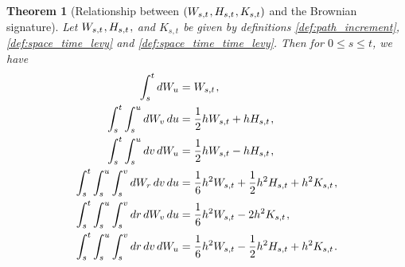 \documentclass[sn-mathphys-num]{sn-jnl}%
\newtheorem{theorem}{Theorem}%
\newcommand{\m}{\hspace{0.25mm}}
\begin{document}
\begin{theorem}[Relationship between $(W_{s,t}\m, H_{s,t}\m, K_{s,t})$ and the Brownian signature]\label{thm:whk_relation}
Let $W_{s,t}\m, H_{s,t}\m,$ and $K_{s,t}$ be given by definitions \ref{def:path_increment}, \ref{def:space_time_levy} and \ref{def:space_time_time_levy}. Then for $0\leq s\leq t$, we have
\begin{align}
\int_s^t dW_u & = W_{s,t}\m,\label{eq:increment}\\
\int_s^t\int_s^u dW_v\, du &  = \frac{1}{2}h W_{s,t} + hH_{s,t}\m,\label{eq:st_area1}\\
 \int_s^t\int_s^u dv\, dW_u & = \frac{1}{2}h W_{s,t} - hH_{s,t}\m,\label{eq:st_area2}\\
 \int_s^t\int_s^u\int_s^v dW_r\, dv\, du & = \frac{1}{6}h^2 W_{s,t} + \frac{1}{2}h^2 H_{s,t} + h^2 K_{s,t}\m,\label{eq:stt_area1}\\
 \int_s^t\int_s^u\int_s^v dr\, dW_v\, du & = \frac{1}{6}h^2 W_{s,t} - 2h^2 K_{s,t}\m,\label{eq:stt_area2}\\
  \int_s^t\int_s^u\int_s^v dr\, dv\, dW_u & = \frac{1}{6}h^2 W_{s,t} - \frac{1}{2}h^2 H_{s,t} + h^2 K_{s,t}\m.\label{eq:stt_area3}
\end{align}
\end{theorem}
\end{document}

